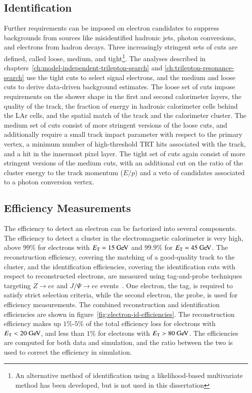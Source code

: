 \subsection{Identification}
Further requirements can be imposed on electron candidates to suppress backgrounds from sources like misidentified hadronic jets, photon conversions, and electrons from hadron decays. Three increasingly stringent sets of cuts are defined, called loose, medium, and tight\footnote{An alternative method of identification using a likelihood-based multivariate method has been developed, but is not used in this dissertation}. The analyses described in chapters~\ref{ch:model-independent-trilepton-search} and \ref{ch:trilepton-resonance-search} use the tight cuts to select signal electrons, and the medium and loose cuts to derive data-driven background estimates. The loose set of cuts impose requirements on the shower shape in the first and second calorimeter layers, the quality of the track, the fraction of energy in hadronic calorimeter cells behind the LAr cells, and the spatial match of the track and the calorimeter cluster. The medium set of cuts consist of more stringent versions of the loose cuts, and additionally require a small track impact parameter with respect to the primary vertex, a minimum number of high-threshold TRT hits associated with the track, and a hit in the innermost pixel layer. The tight set of cuts again consist of more stringent versions of the medium cuts, with an additional cut on the ratio of the cluster energy to the track momentum ($E/p$) and a veto of candidates associated to a photon conversion vertex. 


\subsection{Efficiency Measurements}\label{sec:reco-electron-efficiency}
The efficiency to detect an electron can be factorized into several components. The efficiency to detect a cluster in the electromagnetic calorimeter is very high, above $99\%$ for electrons with $\Et=15 \GeV$ and $99.9\%$ for $\Et=45 \GeV$. The reconstruction efficiency, covering the matching of a good-quality track to the cluster, and the identification efficiencies, covering the identification cuts with respect to reconstructed electrons, are measured using tag-and-probe techniques targeting $Z\rightarrow ee$ and $J/\Psi\rightarrow ee$ events~\cite{TheATLASCollaboration:2014vz}. One electron, the tag, is required to satisfy strict selection criteria, while the second electron, the probe, is used for efficiency measurements. The combined reconstruction and identification efficiencies are shown in figure~\ref{fig:electron-id-efficiencies}. The reconstruction efficiency makes up $1\%$-$5\%$ of the total efficiency loss for electrons with $\Et<20 \GeV$, and less than $1\%$ for electrons with $\Et>80 \GeV$. The efficiencies are computed for both data and simulation, and the ratio between the two is used to correct the efficiency in simulation.

